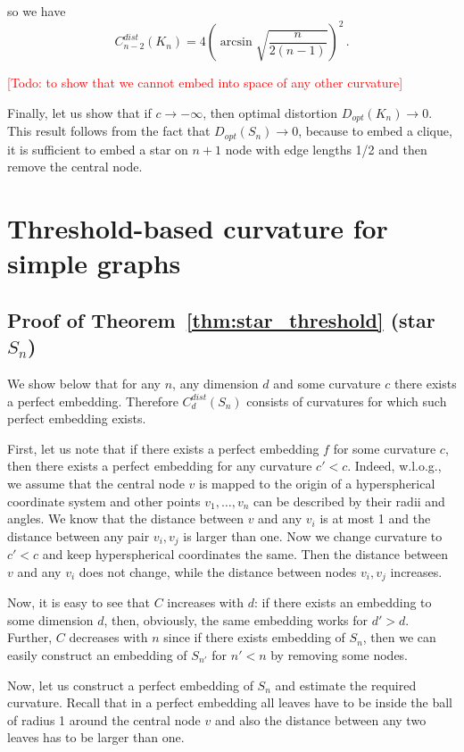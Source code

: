 \documentclass{article} %
\begin{document}
so we have
\[
C_{n-2}^{dist}(K_n) = 4 \left(\arcsin \sqrt{\frac{n}{2(n-1)}}\right)^2\,.
\]

\textcolor{red}{[Todo: to show that we cannot embed into space of any other curvature]}

Finally, let us show that if $c \to -\infty$, then optimal distortion $D_{opt}(K_n) \to 0$. This result follows from the fact that $D_{opt}(S_n) \to 0$, because to embed a clique, it is sufficient to embed a star on $n+1$ node with edge lengths 1/2 and then remove the central node. 

\section{Threshold-based curvature for simple graphs}

\subsection{Proof of Theorem~\ref{thm:star_threshold} (star $S_n$)}

We show below that for any $n$, any dimension $d$ and some curvature $c$ there exists a perfect embedding.
Therefore $C_d^{dist}(S_n)$ consists of curvatures for which such perfect embedding exists. 

First, let us note that if there exists a perfect embedding $f$ for some curvature $c$, then there exists a perfect embedding for any curvature $c' < c$. Indeed, w.l.o.g., we assume that the central node $v$ is mapped to the origin of a hyperspherical coordinate system and other points $v_1, \ldots, v_n$ can be described by their radii and angles. We know that the distance between $v$ and any $v_i$ is at most 1 and the distance between any pair $v_i, v_j$ is larger than one. Now we change curvature to $c' < c$ and keep hyperspherical coordinates the same. Then the distance between $v$ and any $v_i$ does not change, while the distance between nodes $v_i, v_j$ increases.

Now, it is easy to see that $C$ increases with $d$: if there exists an embedding to some dimension $d$, then, obviously, the same embedding works for $d' > d$. Further, $C$ decreases with $n$ since if there exists embedding of $S_n$, then we can easily construct an embedding of $S_{n'}$ for $n' < n$ by removing some nodes. 

Now, let us construct a perfect embedding of $S_n$
and estimate the required curvature.
Recall that in a perfect embedding all leaves have to be inside the ball of radius 1 around the central node $v$ and also the distance between any two leaves has to be larger than one. 
\end{document}
